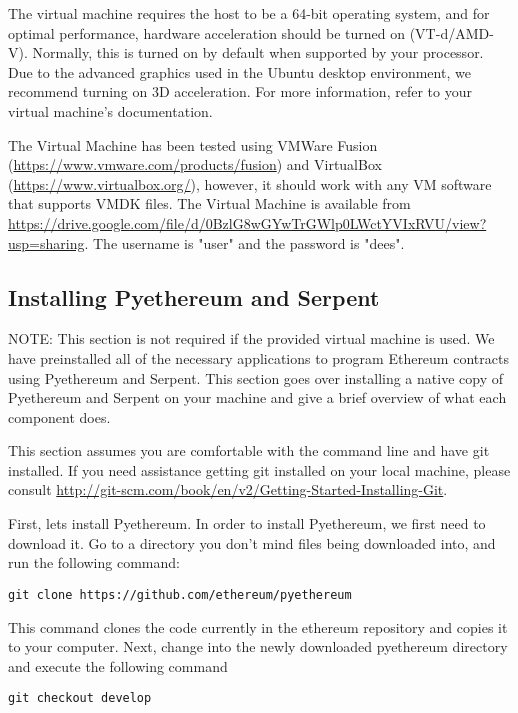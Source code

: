 \documentclass[12pt]{article}
\begin{document}
The virtual machine requires the host to be a 64-bit operating system, and for optimal performance, hardware acceleration should be turned on (VT-d/AMD-V). Normally, this is turned on by default when supported by your processor. Due to the advanced graphics used in the Ubuntu desktop environment, we recommend turning on 3D acceleration. For more information, refer to your virtual machine's documentation.

The Virtual Machine has been tested using VMWare Fusion (\url{https://www.vmware.com/products/fusion}) and VirtualBox (\url{https://www.virtualbox.org/}), however, it should work with any VM software that supports VMDK files. The Virtual Machine is available from \url{https://drive.google.com/file/d/0BzlG8wGYwTrGWlp0LWctYVIxRVU/view?usp=sharing}. The username is "user" and the password is "dees". 

\subsection{Installing Pyethereum and Serpent}
\begin{framed}
NOTE: This section is not required if the provided virtual machine is used. We have preinstalled all of the necessary applications to program Ethereum contracts using Pyethereum and Serpent. This section goes over installing a native copy of Pyethereum and Serpent on your machine and give a brief overview of what each component does.
\end{framed}

This section assumes you are comfortable with the command line and have git installed. If you need assistance getting git installed on your local machine, please consult \url{http://git-scm.com/book/en/v2/Getting-Started-Installing-Git}.

First, lets install Pyethereum. 
In order to install Pyethereum, we first need to download it. Go to a directory you don't mind files being downloaded into, and run the following command:

\begin{verbatim}
git clone https://github.com/ethereum/pyethereum
\end{verbatim}

This command clones the code currently in the ethereum repository and copies it to your computer. Next, change into the newly downloaded pyethereum directory and execute the following command

\begin{verbatim}
git checkout develop
\end{verbatim}
\end{document}
